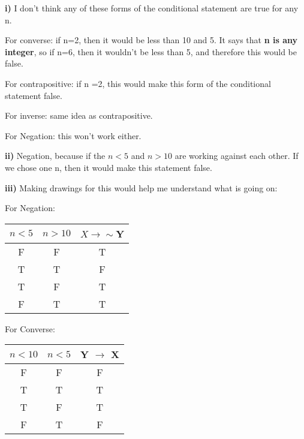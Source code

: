 \documentclass{article}
\begin{document}
\textbf{i)} I don't think any of these forms of the conditional statement are true for any n. 

For converse: if n=2, then it would be less than 10 and 5. It says that \textbf{n is any integer}, so if n=6, then it wouldn't be less than 5, and therefore this would be false.
\vspace{2mm}

For contrapositive: if n =2, this would make this form of the conditional statement false.
\vspace{2mm}

For inverse: same idea as contrapositive.
\vspace{2mm}

For Negation: this won't work either.

\vspace{3mm}

\textbf{ii)} Negation, because if the $n<5$ and $n>10$ are working against each other. If we chose one n, then it would make this statement false.

\vspace{3mm} 

\textbf{iii)} Making drawings for this would help me understand what is going on:

\vspace{3mm}

For Negation: 
\begin{center}
\begin{tabular}{| c | c | c |}

$n <5$ & $n>10$ &  $X \rightarrow \sim$Y \\
\hline
F & F & T\\
T & T & F \\
T & F & T \\
F & T & T
\end{tabular}
\end{center}



For Converse: 
\begin{center}
\begin{tabular}{| c | c | c |}

$n<10$ & $n<5$ & Y $\rightarrow$ X \\
\hline
F & F & F \\
T & T & T \\
T & F & T\\
F & T & F
\end{tabular}
\end{center}
\end{document}
